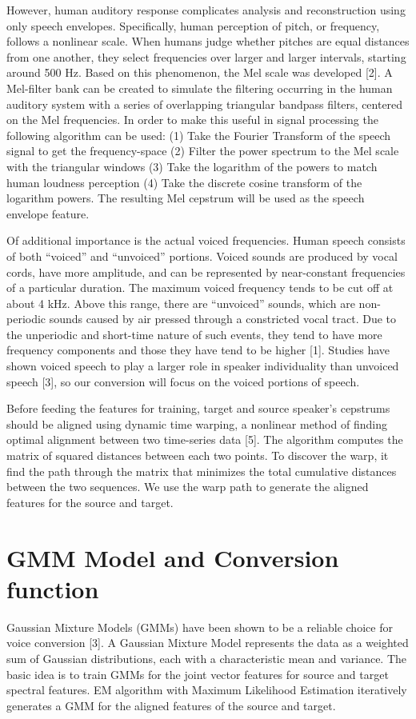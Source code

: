 \documentclass{article}
\begin{document}
However, human auditory response complicates analysis and reconstruction using only speech envelopes. Specifically, human perception of pitch, or frequency, follows a nonlinear scale. When humans judge whether pitches are equal distances from one another, they select frequencies over larger and larger intervals, starting around 500 Hz. Based on this phenomenon, the Mel scale was developed [2]. A Mel-filter bank can be created to simulate the filtering occurring in the human auditory system with a series of overlapping triangular bandpass filters, centered on the Mel frequencies. In order to make this useful in signal processing the following algorithm can be used:
(1)  Take the Fourier Transform of the speech signal to get the frequency-space
(2)  Filter the power spectrum to the Mel scale with the triangular windows
(3)  Take the logarithm of the powers to match human loudness perception
(4)  Take the discrete cosine transform of the logarithm powers.
 The resulting Mel cepstrum will be used as the speech envelope feature.
 
Of additional importance is the actual voiced frequencies. Human speech consists of both ``voiced'' and ``unvoiced'' portions. Voiced sounds are produced by vocal cords, have more amplitude, and can be represented by near-constant frequencies of a particular duration. The maximum voiced frequency tends to be cut off at about 4 kHz. Above this range, there are ``unvoiced'' sounds, which are non-periodic sounds caused by air pressed through a constricted vocal tract. Due to the unperiodic and short-time nature of such events, they tend to have more frequency components and those they have tend to be higher [1]. Studies have shown voiced speech to play a larger role in speaker individuality than unvoiced speech [3], so our conversion will focus on the voiced portions of speech.

Before feeding the features for training, target and source speaker's cepstrums should be aligned using dynamic time warping, a nonlinear method of finding optimal alignment between two time-series data [5]. The algorithm computes the matrix of squared distances between each two points. To discover the warp, it find the path through the matrix that minimizes the total cumulative distances between the two sequences. We use the warp path to generate the aligned features for the source and target.

\section{GMM Model and Conversion function}
Gaussian Mixture Models (GMMs) have been shown to be a reliable choice for voice conversion [3]. A Gaussian Mixture Model represents the data as a weighted sum of Gaussian distributions, each with a characteristic mean and variance. The basic idea is to train GMMs for the joint vector features for source and target spectral features. EM algorithm with Maximum Likelihood Estimation iteratively generates a GMM for the aligned features of the source and target. 
\end{document}
